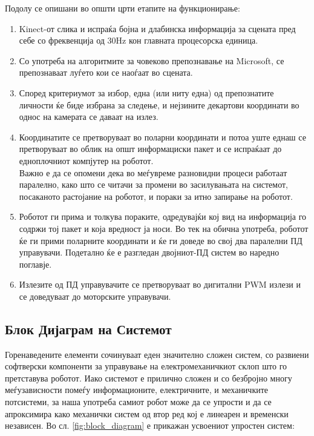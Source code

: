\documentclass[11pt]{article}
\begin{document}
    Подолу се опишани во општи црти етапите на функционирање:
    \renewcommand{\theenumii}{\arabic{enumii}}
    \renewcommand{\theenumiii}{\arabic{enumiii}}
    \begin{enumerate}
      \item Kinect-от слика и испраќа бојна и длабинска информација за сцената пред себе со фреквенција од 30Hz кон главната процесорска единица.
      \item Со употреба на алгоритмите за човеково препознавање на Microsoft, се препознаваат луѓето кои се наоѓаат во сцената.
      \item Според критериумот за избор, една (или ниту една) од препознатите личности ќе биде избрана за следење, и нејзините декартови координати во однос на камерата се даваат на излез.
      \item Координатите се претворуваат во поларни координати и потоа уште еднаш се претворуваат во облик на општ информациски пакет и се испраќаат до едноплочниот компјутер на роботот.
      \\
      Важно е да се опомени дека во меѓувреме разновидни процеси работаат паралелно, како што се читачи за промени во засилувањата на системот, посаканото растојание на роботот, и пораки за итно запирање на роботот.
      \item Роботот ги прима и толкува пораките, одредувајќи кој вид на информација го содржи тој пакет и која вредност ја носи. Во тек на обична употреба, роботот ќе ги прими поларните координати и ќе ги доведе во свој два паралелни ПД управувачи. Подетално ќе е разгледан двојниот-ПД систем во наредно поглавје.
      \item Излезите од ПД управувачите се претворуваат во дигитални PWM излези и се доведуваат до моторските управувачи.
      \end{enumerate}

  \subsection{Блок Дијаграм на Системот}
    Горенаведените елементи сочинуваат еден значително сложен систем, со развиени софтверски компоненти за управување на електромеханичкиот склоп што го претставува роботот. Иако системот е прилично сложен и со безбројно многу меѓузависности помеѓу информационите, електричните, и механичките потсистеми, за наша употреба самиот робот може да се упрости и да се апроксимира како механички систем од втор ред кој е линеарен и временски независен. Во сл. \ref{fig:block_diagram} е прикажан усвоениот   упростен систем:\\
\end{document}
